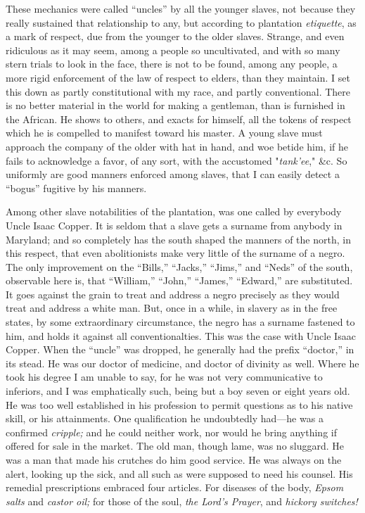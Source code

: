 These mechanics were called ``uncles'' by all the younger slaves, not
because they really sustained that relationship to any, but according to
plantation \emph{etiquette}, as a mark of respect, due from the younger
to the older slaves. Strange, and even ridiculous as it may seem, among
a people so uncultivated, and with so many stern trials to look in the
face, there is not to be found, among any people, a more rigid
enforcement of the law of respect to elders, than they maintain. I set
this down as partly constitutional with my race, and partly
conventional. There is no better {\protect\hypertarget{70}{}{}}material
in the world for making a gentleman, than is furnished in the African.
He shows to others, and exacts for himself, all the tokens of respect
which he is compelled to manifest toward his master. A young slave must
approach the company of the older with hat in hand, and woe betide him,
if he fails to acknowledge a favor, of any sort, with the accustomed
"\emph{tank'ee}," \&c. So uniformly are good manners enforced among
slaves, that I can easily detect a ``bogus'' fugitive by his manners.

Among other slave notabilities of the plantation, was one called by
everybody Uncle Isaac Copper. It is seldom that a slave gets a surname
from anybody in Maryland; and so completely has the south shaped the
manners of the north, in this respect, that even abolitionists make very
little of the surname of a negro. The only improvement on the ``Bills,''
``Jacks,'' ``Jims,'' and ``Neds'' of the south, observable here is, that
``William,'' ``John,'' ``James,'' ``Edward,'' are substituted. It goes
against the grain to treat and address a negro precisely as they would
treat and address a white man. But, once in a while, in slavery as in
the free states, by some extraordinary circumstance, the negro has a
surname fastened to him, and holds it against all conventionalties. This
was the case with Uncle Isaac Copper. When the ``uncle'' was dropped, he
generally had the prefix ``doctor,'' in its stead. He was our doctor of
medicine, and doctor of divinity as well. Where he took his degree I am
unable to say, for he was not very communicative to inferiors, and I was
emphatically such, being but a boy seven or eight years old. He
{\protect\hypertarget{71}{}{}}was too well established in his profession
to permit questions as to his native skill, or his attainments. One
qualification he undoubtedly had---he was a confirmed \emph{cripple;}
and he could neither work, nor would he bring anything if offered for
sale in the market. The old man, though lame, was no sluggard. He was a
man that made his crutches do him good service. He was always on the
alert, looking up the sick, and all such as were supposed to need his
counsel. His remedial prescriptions embraced four articles. For diseases
of the body, \emph{Epsom salts} and \emph{castor oil;} for those of the
soul, \emph{the Lord's Prayer}, and \emph{hickory switches!}

